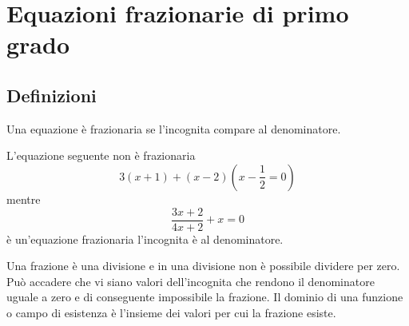 \chapter{Equazioni frazionarie di primo grado}
\label{cha:Equazionefrazionariaprimogrado}
\section{Definizioni}
\label{sec:definizioni}
Una equazione è frazionaria se l'incognita compare al denominatore.
\begin{esempio}
L'equazione seguente non è frazionaria
\[3(x+1)+(x-2)(x-\dfrac{1}{2}=0) \]
mentre
\[\dfrac{3x+2}{4x+2}+x=0 \]
è un'equazione frazionaria l'incognita è al denominatore.
\end{esempio}
Una frazione è una divisione e in una divisione non è possibile dividere per zero. Può accadere  che vi siano valori dell'incognita che rendono il denominatore uguale a zero e di conseguente impossibile la frazione. Il dominio di una funzione o campo di esistenza è l'insieme dei valori per cui la frazione esiste.
